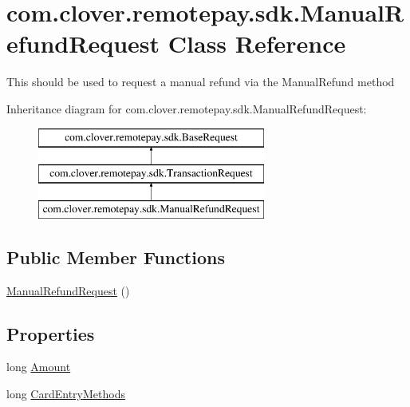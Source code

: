 \hypertarget{classcom_1_1clover_1_1remotepay_1_1sdk_1_1_manual_refund_request}{}\section{com.\+clover.\+remotepay.\+sdk.\+Manual\+Refund\+Request Class Reference}
\label{classcom_1_1clover_1_1remotepay_1_1sdk_1_1_manual_refund_request}


This should be used to request a manual refund via the Manual\+Refund method  


Inheritance diagram for com.\+clover.\+remotepay.\+sdk.\+Manual\+Refund\+Request\+:\begin{figure}[H]
\begin{center}
\leavevmode
\includegraphics[height=3.000000cm]{classcom_1_1clover_1_1remotepay_1_1sdk_1_1_manual_refund_request}
\end{center}
\end{figure}
\subsection*{Public Member Functions}
\begin{DoxyCompactItemize}
\item 
\hyperlink{classcom_1_1clover_1_1remotepay_1_1sdk_1_1_manual_refund_request_aa45969f2cd3e51d93613c17cb3a0db4b}{Manual\+Refund\+Request} ()
\end{DoxyCompactItemize}
\subsection*{Properties}
\begin{DoxyCompactItemize}
\item 
long \hyperlink{classcom_1_1clover_1_1remotepay_1_1sdk_1_1_manual_refund_request_aec10ad5d6babdfb26e091c0e23de44a6}{Amount}
\item 
long \hyperlink{classcom_1_1clover_1_1remotepay_1_1sdk_1_1_manual_refund_request_a9e34fc487579d6f6b68b0e3017e9a829}{Card\+Entry\+Methods}
\end{DoxyCompactItemize}
